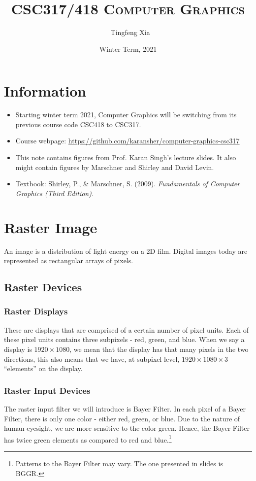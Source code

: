 \documentclass[11pt]{article}
\author{\ccLogo\,\, Tingfeng Xia}
\title{\textsc{CSC317/418 Computer Graphics}}
\date{Winter Term, 2021}
\begin{document}
\maketitle
\doclicenseThis
\section*{Information}
\begin{itemize}
	\item Starting winter term 2021, Computer Graphics will be switching from its previous course code CSC418 to CSC317. 
	\item Course webpage: \url{https://github.com/karansher/computer-graphics-csc317}
	\item This note contains figures from Prof. Karan Singh's lecture slides. It also might contain figures by Marschner and Shirley and David Levin. 
	\item Textbook: Shirley, P., \& Marschner, S. (2009). \textit{Fundamentals of Computer Graphics (Third Edition)}. 
\end{itemize}
\tableofcontents


\section{Raster Image}
An image is a distribution of light energy on a 2D film. Digital images today are represented as rectangular arrays of pixels. 
\subsection{Raster Devices}
\subsubsection{Raster Displays} These are displays that are comprised of a certain number of pixel units. Each of these pixel units contains three subpixels - red, green, and blue. When we say a display is $1920 \times 1080$, we mean that the display has that many pixels in the two directions, this also means that we have, at subpixel level, $1920 \times 1080 \times 3$ ``elements'' on the display. 

\subsubsection{Raster Input Devices}
The raster input filter we will introduce is Bayer Filter. In each pixel of a Bayer Filter, there is only one color - either red, green, or blue. Due to the nature of human eyesight, we are more sensitive to the color green. Hence, the Bayer Filter has twice green elements as compared to red and blue.\footnote{Patterns to the Bayer Filter may vary. The one presented in slides is BGGR.}
\end{document}
